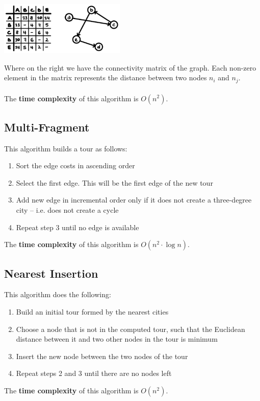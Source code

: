 \documentclass{article}
\begin{document}
\begin{center}
	\includegraphics[width=6cm]{nn.png}
\end{center}
\vspace{.3cm}
Where on the right we have the connectivity matrix of the graph. Each non-zero element in the matrix represents the distance between two nodes $n_i$ and $n_j$. \\ \\
The \textbf{time complexity} of this algorithm is $O(n^2)$.

\subsection{Multi-Fragment}
This algorithm builds a tour as follows:

\begin{enumerate}
	\item Sort the edge costs in ascending order
	\item Select the first edge. This will be the first edge of the new tour
	\item Add new edge in incremental order only if it does not create a three-degree city -- i.e. does not create a cycle
	\item Repeat step 3 until no edge is available
\end{enumerate}
The \textbf{time complexity} of this algorithm is $O(n^2 \cdot \log n)$.

\subsection{Nearest Insertion}
This algorithm does the following:

\begin{enumerate}
	\item Build an initial tour formed by the nearest cities
	\item Choose a node that is not in the computed tour, such that the Euclidean distance between it and two other nodes in the tour is minimum
	\item Insert the new node between the two nodes of the tour
	\item Repeat steps 2 and 3 until there are no nodes left
\end{enumerate}
The \textbf{time complexity} of this algorithm is $O(n^2)$.
\end{document}
